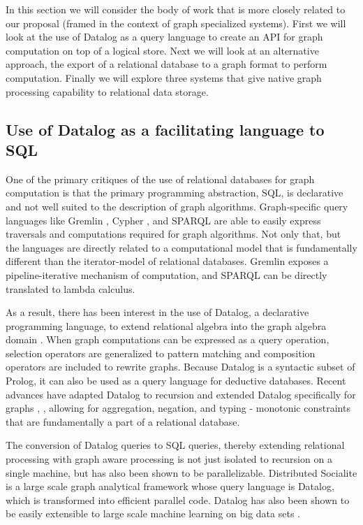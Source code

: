 \documentclass[11pt,letterpaper]{article}
\begin{document}
In this section we will consider the body of work that is more closely related to our proposal (framed in the context of graph specialized systems). First we will look at the use of Datalog as a query language to create an API for graph computation on top of a logical store. Next we will look at an alternative approach, the export of a relational database to a graph format to perform computation. Finally we will explore three systems that give native graph processing capability to relational data storage.

\subsection*{Use of Datalog as a facilitating language to SQL}

One of the primary critiques of the use of relational databases for graph computation is that the primary programming abstraction, SQL, is declarative and not well suited to the description of graph algorithms. Graph-specific query languages like Gremlin \cite{rodriguez_gremlin_2013}, Cypher \cite{miller_graph_2013}, and SPARQL \cite{prudhommeaux_sparql_2008} are able to easily express traversals and computations required for graph algorithms. Not only that, but the languages are directly related to a computational model that is fundamentally different than the iterator-model of relational databases. Gremlin exposes a pipeline-iterative mechanism of computation, and SPARQL can be directly translated to lambda calculus.

As a result, there has been interest in the use of Datalog, a declarative programming language, to extend relational algebra into the graph algebra domain \cite{he_graphs-at--time:_2008}. When graph computations can be expressed as a query operation, selection operators are generalized to pattern matching and composition operators are included to rewrite graphs. Because Datalog is a syntactic subset of Prolog, it can also be used as a query language for deductive databases. Recent advances have adapted Datalog to recursion and extended Datalog specifically for graphs \cite{shkapsky_graph_2013}, \cite{green_datalog_2013}, allowing for aggregation, negation, and typing - monotonic constraints that are fundamentally a part of a relational database.

The conversion of Datalog queries to SQL queries, thereby extending relational processing with graph aware processing is not just isolated to recursion on a single machine, but has also been shown to be parallelizable. Distributed Socialite \cite{seo_distributed_2013} is a large scale graph analytical framework whose query language is Datalog, which is transformed into efficient parallel code. Datalog has also been shown to be easily extensible to large scale machine learning on big data sets \cite{bu_scaling_2012}.
\end{document}
